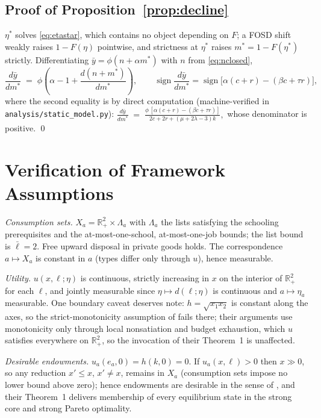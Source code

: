 \documentclass[12pt,letterpaper]{article}
\theoremstyle{definition}
\newcommand{\Lists}{\Lambda}
\newcommand{\R}{\mathbb{R}}
\begin{document}
\subsection{Proof of Proposition~\ref{prop:decline}} $\eta^\ast$ solves \eqref{eq:etastar}, which contains no object depending on $F$; a FOSD shift weakly raises $1-F(\eta)$ pointwise, and strictness at $\eta^\ast$ raises $m^\ast=1-F(\eta^\ast)$ strictly.
Differentiating $\bar{y} = \phi(n+\alpha m^\ast)$ with $n$ from \eqref{eq:nclosed}, \[ \frac{d\bar{y}}{dm^\ast} \;=\; \phi\left(\alpha - 1 + \frac{d(n+m^\ast)}{dm^\ast}\right),
\qquad
\operatorname{sign}\frac{d\bar{y}}{dm^\ast} = \operatorname{sign}\big[\alpha(c+r) - (\beta c + \tau r)\big], \] where the second equality is by direct computation (machine-verified in \texttt{analysis/static\_model.py}): $\frac{d\bar{y}}{dm^\ast} \;=\; \frac{\phi\,[\alpha(c+r)-(\beta c+\tau r)]}{2c+2r+(\mu+2\lambda-3)k},$ whose denominator is positive.
\qed

\section{Verification of Framework Assumptions}\label{app:assumptions}

\emph{Consumption sets.}
$X_a = \R^2_+\times\Lists_a$ with $\Lists_a$ the lists satisfying the schooling prerequisites and the at-most-one-school, at-most-one-job bounds; the list bound is $\bar\ell=2$.
Free upward disposal in private goods holds.
The correspondence $a\mapsto X_a$ is constant in $a$ (types differ only through $u$), hence measurable.

\emph{Utility.}
$u(x,\ell;\eta)$ is continuous, strictly increasing in $x$ on the interior of $\R^2_+$ for each $\ell$, and jointly measurable since $\eta\mapsto d(\ell;\eta)$ is continuous and $a\mapsto\eta_a$ measurable.
One boundary caveat deserves note: $h=\sqrt{x_1x_2}$ is constant along the axes, so the strict-monotonicity assumption of \citet{ellickson2006organization} fails there; their arguments use monotonicity only through local nonsatiation and budget exhaustion, which $u$ satisfies everywhere on $\R^2_+$, so the invocation of their Theorem~1 is unaffected.

\emph{Desirable endowments.}
$u_a(e_a,0) = h(k,0) = 0$.
If $u_a(x,\ell)>0$ then $x\gg 0$, so any reduction $x'\leq x$, $x'\neq x$, remains in $X_a$ (consumption sets impose no lower bound above zero); hence endowments are desirable in the sense of \citet[Section~9.4]{ellickson2006organization}, and their Theorem~1 delivers membership of every equilibrium state in the strong core and strong Pareto optimality.
\end{document}
